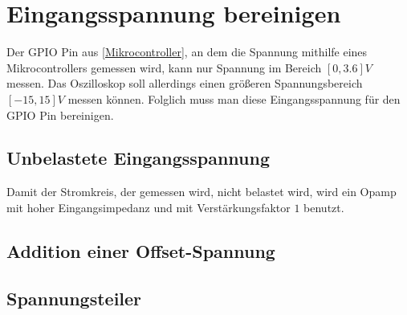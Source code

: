 \section{Eingangsspannung bereinigen}
\label{Eingangsspannung bereinigen}

Der GPIO Pin aus \ref{Mikrocontroller}, an dem die Spannung mithilfe eines Mikrocontrollers gemessen wird,
kann nur Spannung im Bereich $[0, 3.6]V$ messen.
Das Oszilloskop soll allerdings einen größeren Spannungsbereich $[-15, 15]V$ messen können.
Folglich muss man diese Eingangsspannung für den GPIO Pin bereinigen.

\subsection{Unbelastete Eingangsspannung}
\label{Unbelastete Eingangsspannung}
Damit der Stromkreis, der gemessen wird, nicht belastet wird, wird ein Opamp mit hoher Eingangsimpedanz und
mit Verstärkungsfaktor $1$ benutzt.

\subsection{Addition einer Offset-Spannung}
\label{Addition einer Offset-Spannung}

\subsection{Spannungsteiler}
\label{Spannungsteiler}

